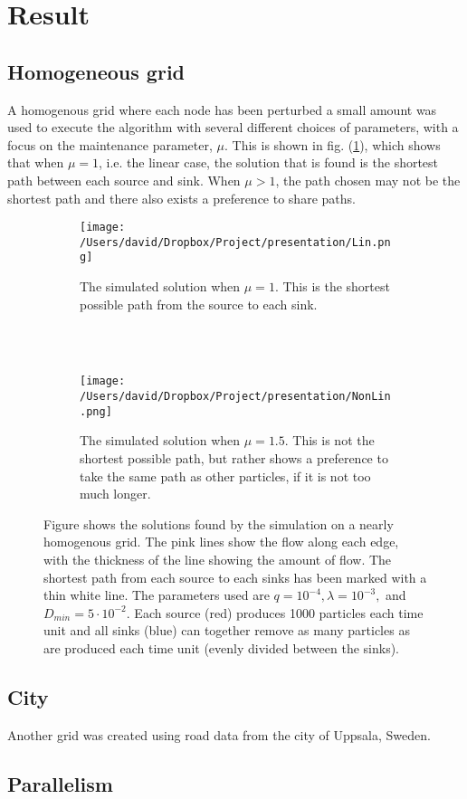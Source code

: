 \section{Result}
\label{sec:result}

\subsection{Homogeneous grid}

A homogenous grid where each node has been perturbed a small amount was used to execute the algorithm with several different choices of parameters, with a focus on the maintenance parameter, $\mu$. This is shown in fig. (\ref{fig:homogeneous}), which shows that when $\mu = 1$, i.e. the linear case, the solution that is found is the shortest path between each source and sink. When $\mu > 1$, the path chosen may not be the shortest path and there also exists a preference to share paths.

\begin{figure}
\centering
\begin{subfigure}[b]{0.48\textwidth}
\texttt{[image: /Users/david/Dropbox/Project/presentation/Lin.png]}
\caption{The simulated solution when $\mu=1$. This is the shortest possible path from the source to each sink.
\\
\\}
\end{subfigure}
~
\begin{subfigure}[b]{0.48\textwidth}
\texttt{[image: /Users/david/Dropbox/Project/presentation/NonLin.png]}
\caption{The simulated solution when $\mu=1.5$. This is not the shortest possible path, but rather shows a preference to take the same path as other particles, if it is not too much longer.}
\end{subfigure}
\caption{Figure shows the solutions found by the simulation on a nearly homogenous grid. The pink lines show the flow along each edge, with the thickness of the line showing the amount of flow. The shortest path from each source to each sinks has been marked with a thin white line. The parameters used are $q = 10^{-4},\lambda = 10^{-3},$ and $D_{min}=5 \cdot 10^{-2}$. Each source (red) produces 1000 particles each time unit and all sinks (blue) can together remove as many particles as are produced each time unit (evenly divided between the sinks).}
\label{fig:homogeneous}
\end{figure}

\subsection{City}

Another grid was created using road data from the city of Uppsala, Sweden.

\subsection{Parallelism}
